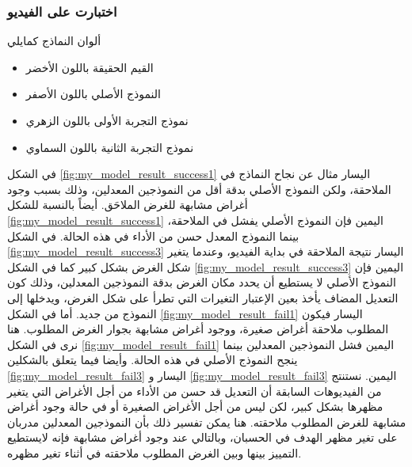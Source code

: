 \subsubsection{اختبارت على  الفيديو}
ألوان النماذج كمايلي
\begin{itemize}
	\item 	القيم الحقيقة باللون الأخضر
	\item
	النموذج الأصلي 
	باللون الأصفر
	\item
	نموذج التجربة الأولى
	باللون الزهري
	\item
	نموذج التجربة الثانية
	باللون السماوي
\end{itemize}

في الشكل
\ref{fig:my_model_result_success1}
اليسار
مثال عن نجاح النماذج في الملاحقة، ولكن النموذج الأصلي بدقة أقل من النموذجين المعدلين، وذلك بسبب وجود أغراض مشابهة للغرض الملاحَق.
أيضاً بالنسبة للشكل
\ref{fig:my_model_result_success1}
اليمين
فإن النموذج الأصلي يفشل في الملاحقة، بينما النموذج المعدل حسن من الأداء في هذه الحالة.
\newline
في الشكل 
\ref{fig:my_model_result_success3}
اليسار
نتيجة الملاحقة في بداية الفيديو، وعندما يتغير شكل الغرض بشكل كبير كما في الشكل 
\ref{fig:my_model_result_success3}
اليمين
فإن النموذج الأصلي لا يستطيع أن يحدد مكان الغرض بدقة النموذجين المعدلين، وذلك كون التعديل المضاف يأخذ بعين الإعتبار التغيرات التي تطرأ على شكل الغرض، ويدخلها إلى النموذج من جديد.
\newline
أما في الشكل
	\ref{fig:my_model_result_fail1}
	اليسار
	فيكون المطلوب ملاحقة أغراض صغيرة، ووجود أغراض مشابهة بجوار الغرض المطلوب.
	هنا نرى في الشكل 
	\ref{fig:my_model_result_fail1}
	اليمين
	فشل النموذجين المعدلين بينما ينجح النموذج الأصلي في هذه الحالة.
	وأيضا فيما يتعلق بالشكلين
	\ref{fig:my_model_result_fail3}
	اليسار
		و
	\ref{fig:my_model_result_fail3}
	اليمين.
	\newline
	نستنتج من الفيديوهات السابقة أن التعديل قد حسن من الأداء من أجل الأغراض التي يتغير مظهرها بشكل كبير، لكن ليس من أجل الأغراض الصغيرة أو في حالة وجود أغراض مشابهة للغرض المطلوب ملاحقته.
	هنا يمكن تفسير ذلك بأن النموذجين المعدلين مدربان على تغير مظهر الهدف في الحسبان، وبالتالي عند وجود أغراض مشابهة فإنه لايستطيع التمييز بينها وبين الغرض المطلوب ملاحقته في أثناء تغير مظهره.
